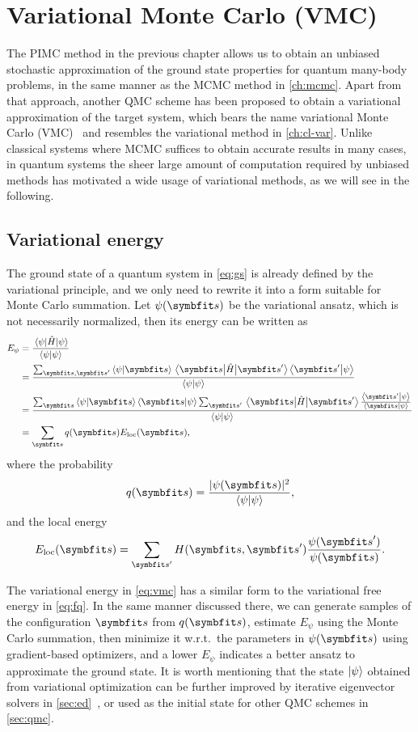 \chapter{Variational Monte Carlo (VMC)}
\label{ch:vmc}

The PIMC method in the previous chapter allows us to obtain an unbiased stochastic approximation of the ground state properties for quantum many-body problems, in the same manner as the MCMC method in \cref{ch:mcmc}. Apart from that approach, another QMC scheme has been proposed to obtain a variational approximation of the target system, which bears the name variational Monte Carlo (VMC)~\cite{scherer2017computational, sorella2005wave} and resembles the variational method in \cref{ch:cl-var}. Unlike classical systems where MCMC suffices to obtain accurate results in many cases, in quantum systems the sheer large amount of computation required by unbiased methods has motivated a wide usage of variational methods, as we will see in the following.

\section{Variational energy}

The ground state of a quantum system in \cref{eq:gs} is already defined by the variational principle, and we only need to rewrite it into a form suitable for Monte Carlo summation. Let $\psi(\vs)$ be the variational ansatz, which is not necessarily normalized, then its energy can be written as
\begin{align}
E_\psi &= \frac{\ev{\hat{H}}{\psi}}{\ip{\psi}} \\
&= \frac
{\sum_{\vs, \vs'} \ip{\psi}{\vs} \mel{\vs}{\hat{H}}{\vs'} \ip{\vs'}{\psi}}
{\ip{\psi}} \\
&= \frac
{\sum_\vs \ip{\psi}{\vs} \ip{\vs}{\psi} \sum_{\vs'} \mel{\vs}{\hat{H}}{\vs'} \frac{\ip{\vs'}{\psi}}{\ip{\vs}{\psi}}}
{\ip{\psi}} \\
&= \sum_\vs q(\vs) E_\text{loc}(\vs), \label{eq:vmc}
\end{align}
where the probability
\begin{equation}
q(\vs) = \frac{|\psi(\vs)|^2}{\ip{\psi}},
\end{equation}
and the local energy
\begin{equation}
E_\text{loc}(\vs) = \sum_{\vs'} H(\vs, \vs') \frac{\psi(\vs')}{\psi(\vs)}.
\end{equation}

The variational energy in \cref{eq:vmc} has a similar form to the variational free energy in \cref{eq:fq}. In the same manner discussed there, we can generate samples of the configuration $\vs$ from $q(\vs)$, estimate $E_\psi$ using the Monte Carlo summation, then minimize it w.r.t.\ the parameters in $\psi(\vs)$ using gradient-based optimizers, and a lower $E_\psi$ indicates a better ansatz to approximate the ground state. It is worth mentioning that the state $\ket{\psi}$ obtained from variational optimization can be further improved by iterative eigenvector solvers in \cref{sec:ed}~\cite{hu2013direct, chen2022systematic}, or used as the initial state for other QMC schemes in \cref{sec:qmc}.

